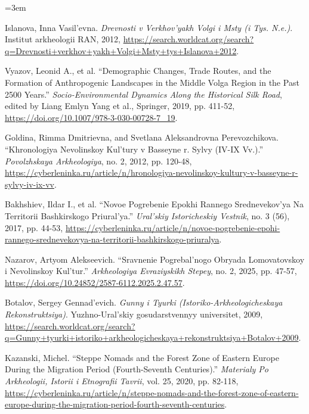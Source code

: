 \IfFileExists{../../_shared/template/intellte.cls}{\documentclass[10pt,onecolumn]{../../_shared/template/intellte}}{\documentclass[10pt,onecolumn]{intellte}}
\newlength{\csllabelwidth}
\newenvironment{CSLReferences}[2]
 {\par\vspace{2pt}%
  \begin{list}{}{%
  \normalfont\rmfamily\mdseries\fontsize{10pt}{15pt}\selectfont\raggedright
  \hyphenpenalty=50\exhyphenpenalty=50\emergencystretch=3em%
  \renewcommand{\bibitem}[2][]{\item\hypertarget{##2}{}}%
  \setlength{\lineskiplimit}{-6pt}%
  \setlength{\leftmargin}{\csllabelwidth}%
  \setlength{\itemindent}{-\csllabelwidth}%
  \setlength{\labelwidth}{\csllabelwidth}%
  \setlength{\labelsep}{0pt}%
  \setlength{\parsep}{0pt}%
  \setlength{\topsep}{0pt}%
  \setlength{\partopsep}{0pt}%
  \setlength{\itemsep}{2pt}}}
 {\end{list}}
\newcommand{\CSLLeftMargin}[1]{\makebox[\csllabelwidth][l]{\normalfont\rmfamily\mdseries\fontsize{10pt}{15pt}\selectfont #1}}
\newcommand{\CSLRightInline}[1]{\normalfont\rmfamily\mdseries\fontsize{10pt}{15pt}\selectfont #1}
\begin{document}
\begin{CSLReferences}{0}{0}
\CSLLeftMargin{13. }%
\CSLRightInline{Islanova, Inna Vasil'evna. \emph{Drevnosti v
Verkhov'yakh Volgi i Msty (i Tys. N.e.)}. Institut arkheologii RAN,
2012,
\url{https://search.worldcat.org/search?q=Drevnosti+verkhov+yakh+Volgi+Msty+tys+Islanova+2012}.}

\CSLLeftMargin{14. }%
\CSLRightInline{Vyazov, Leonid A., et al. {``Demographic Changes, Trade
Routes, and the Formation of Anthropogenic Landscapes in the Middle
Volga Region in the Past 2500 Years.''} \emph{Socio-Environmental
Dynamics Along the Historical Silk Road}, edited by Liang Emlyn Yang et
al., Springer, 2019, pp. 411-52,
\url{https://doi.org/10.1007/978-3-030-00728-7_19}.}

\CSLLeftMargin{15. }%
\CSLRightInline{Goldina, Rimma Dmitrievna, and Svetlana Aleksandrovna
Perevozchikova. {``Khronologiya Nevolinskoy Kul'tury v Basseyne r. Sylvy
(IV-IX Vv.).''} \emph{Povolzhskaya Arkheologiya}, no. 2, 2012, pp.
120-48,
\url{https://cyberleninka.ru/article/n/hronologiya-nevolinskoy-kultury-v-basseyne-r-sylvy-iv-ix-vv}.}

\CSLLeftMargin{16. }%
\CSLRightInline{Bakhshiev, Ildar I., et al. {``Novoe Pogrebenie Epokhi
Rannego Srednevekov'ya Na Territorii Bashkirskogo Priural'ya.''}
\emph{Ural'skiy Istoricheskiy Vestnik}, no. 3 (56), 2017, pp. 44-53,
\url{https://cyberleninka.ru/article/n/novoe-pogrebenie-epohi-rannego-srednevekovya-na-territorii-bashkirskogo-priuralya}.}

\CSLLeftMargin{17. }%
\CSLRightInline{Nazarov, Artyom Alekseevich. {``Sravnenie Pogrebal'nogo
Obryada Lomovatovskoy i Nevolinskoy Kul'tur.''} \emph{Arkheologiya
Evraziyskikh Stepey}, no. 2, 2025, pp. 47-57,
\url{https://doi.org/10.24852/2587-6112.2025.2.47.57}.}

\CSLLeftMargin{18. }%
\CSLRightInline{Botalov, Sergey Gennad'evich. \emph{Gunny i Tyurki
(Istoriko-Arkheologicheskaya Rekonstruktsiya)}. Yuzhno-Ural'skiy
gosudarstvennyy universitet, 2009,
\url{https://search.worldcat.org/search?q=Gunny+tyurki+istoriko+arkheologicheskaya+rekonstruktsiya+Botalov+2009}.}

\CSLLeftMargin{19. }%
\CSLRightInline{Kazanski, Michel. {``Steppe Nomads and the Forest Zone
of Eastern Europe During the Migration Period (Fourth-Seventh
Centuries).''} \emph{Materialy Po Arkheologii, Istorii i Etnografii
Tavrii}, vol. 25, 2020, pp. 82-118,
\url{https://cyberleninka.ru/article/n/steppe-nomads-and-the-forest-zone-of-eastern-europe-during-the-migration-period-fourth-seventh-centuries}.}


\end{CSLReferences}
\end{document}
